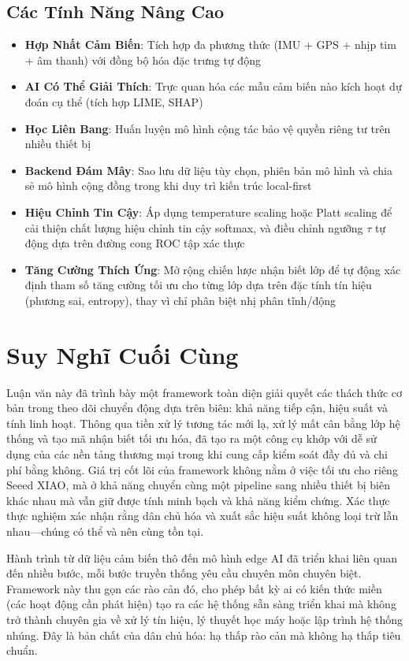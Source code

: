 \subsection{Các Tính Năng Nâng Cao}
\begin{itemize}
    \item \textbf{Hợp Nhất Cảm Biến}: Tích hợp đa phương thức (IMU + GPS + nhịp tim + âm thanh) với đồng bộ hóa đặc trưng tự động
    \item \textbf{AI Có Thể Giải Thích}: Trực quan hóa các mẫu cảm biến nào kích hoạt dự đoán cụ thể (tích hợp LIME, SHAP)
    \item \textbf{Học Liên Bang}: Huấn luyện mô hình cộng tác bảo vệ quyền riêng tư trên nhiều thiết bị
    \item \textbf{Backend Đám Mây}: Sao lưu dữ liệu tùy chọn, phiên bản mô hình và chia sẻ mô hình cộng đồng trong khi duy trì kiến trúc local-first
    \item \textbf{Hiệu Chỉnh Tin Cậy}: Áp dụng temperature scaling \cite{guo2017calibration} hoặc Platt scaling để cải thiện chất lượng hiệu chỉnh tin cậy softmax, và điều chỉnh ngưỡng $\tau$ tự động dựa trên đường cong ROC tập xác thực
    \item \textbf{Tăng Cường Thích Ứng}: Mở rộng chiến lược nhận biết lớp để tự động xác định tham số tăng cường tối ưu cho từng lớp dựa trên đặc tính tín hiệu (phương sai, entropy), thay vì chỉ phân biệt nhị phân tĩnh/động
\end{itemize}

\section{Suy Nghĩ Cuối Cùng}

Luận văn này đã trình bày một framework toàn diện giải quyết các thách thức cơ bản trong theo dõi chuyển động dựa trên biên: khả năng tiếp cận, hiệu suất và tính linh hoạt. Thông qua tiền xử lý tương tác mới lạ, xử lý mất cân bằng lớp hệ thống và tạo mã nhận biết tối ưu hóa, đã tạo ra một công cụ khớp với dễ sử dụng của các nền tảng thương mại trong khi cung cấp kiểm soát đầy đủ và chi phí bằng không. Giá trị cốt lõi của framework không nằm ở việc tối ưu cho riêng Seeed XIAO, mà ở khả năng chuyển cùng một pipeline sang nhiều thiết bị biên khác nhau mà vẫn giữ được tính minh bạch và khả năng kiểm chứng. Xác thực thực nghiệm xác nhận rằng dân chủ hóa và xuất sắc hiệu suất không loại trừ lẫn nhau—chúng có thể và nên cùng tồn tại.

Hành trình từ dữ liệu cảm biến thô đến mô hình edge AI đã triển khai liên quan đến nhiều bước, mỗi bước truyền thống yêu cầu chuyên môn chuyên biệt. Framework này thu gọn các rào cản đó, cho phép bất kỳ ai có kiến thức miền (các hoạt động cần phát hiện) tạo ra các hệ thống sẵn sàng triển khai mà không trở thành chuyên gia về xử lý tín hiệu, lý thuyết học máy hoặc lập trình hệ thống nhúng. Đây là bản chất của dân chủ hóa: hạ thấp rào cản mà không hạ thấp tiêu chuẩn.

